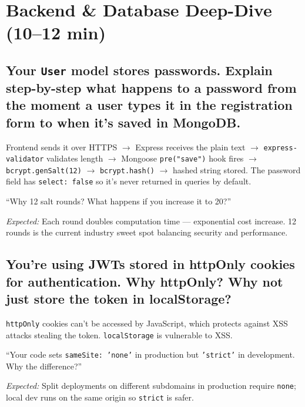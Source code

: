 \documentclass[12pt, a4paper]{article}
\begin{document}
\newpage

\section{Backend \& Database Deep-Dive \textnormal{\textcolor{slatelight}{(10--12 min)}}}

\subsection{Your \texttt{User} model stores passwords. Explain step-by-step what happens to a password from the moment a user types it in the registration form to when it's saved in MongoDB.}

\begin{listenfor}
Frontend sends it over HTTPS $\rightarrow$ Express receives the plain text $\rightarrow$ \texttt{express-validator} validates length $\rightarrow$ Mongoose \texttt{pre("save")} hook fires $\rightarrow$ \texttt{bcrypt.genSalt(12)} $\rightarrow$ \texttt{bcrypt.hash()} $\rightarrow$ hashed string stored. The password field has \texttt{select: false} so it's never returned in queries by default.
\end{listenfor}

\begin{followup}
``Why 12 salt rounds? What happens if you increase it to 20?''

\medskip
\emph{Expected:} Each round doubles computation time — exponential cost increase. 12 rounds is the current industry sweet spot balancing security and performance.
\end{followup}

\subsection{You're using JWTs stored in httpOnly cookies for authentication. Why httpOnly? Why not just store the token in localStorage?}

\begin{listenfor}
\texttt{httpOnly} cookies can't be accessed by JavaScript, which protects against XSS attacks stealing the token. \texttt{localStorage} is vulnerable to XSS.
\end{listenfor}

\begin{followup}
``Your code sets \texttt{sameSite: 'none'} in production but \texttt{'strict'} in development. Why the difference?''

\medskip
\emph{Expected:} Split deployments on different subdomains in production require \texttt{none}; local dev runs on the same origin so \texttt{strict} is safer.
\end{followup}
\end{document}
